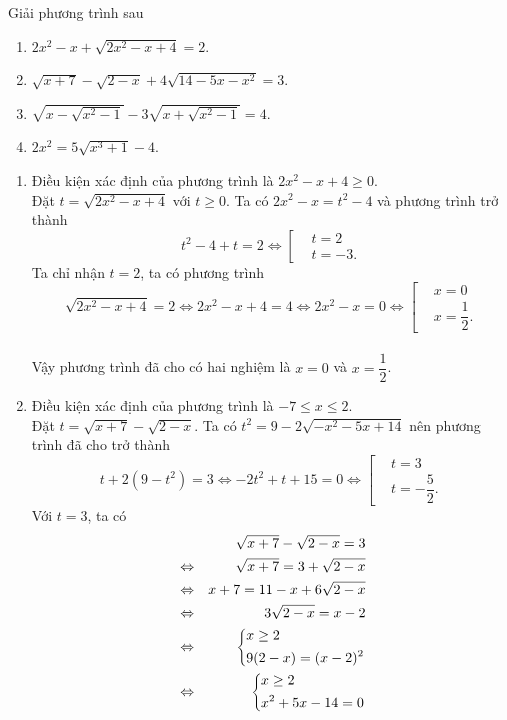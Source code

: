 \begin{vd}
	Giải phương trình sau
	\begin{enumerate}
		\item $2x^2-x+\sqrt{2x^2-x+4}=2$.
		\item $\sqrt{x+7}-\sqrt{2-x}+4\sqrt{14-5x-x^2}=3$.
		\item $\sqrt{x-\sqrt{x^2-1}}-3\sqrt{x+\sqrt{x^2-1}}=4$.
		\item $2x^2=5\sqrt{x^3+1}-4$.
	\end{enumerate}
	\loigiai
	{
		\begin{enumerate}
			\item Điều kiện xác định của phương trình là $2x^2-x+4 \geq 0$.\\
			Đặt $t=\sqrt{2x^2-x+4}$ với $t\geq 0$. Ta có $2x^2-x=t^2-4$ và phương trình trở thành
			$$t^2-4+t=2 \Leftrightarrow \left[\begin{aligned}&t=2 \\&t=-3.\end{aligned}\right.$$
			Ta chỉ nhận $t=2$, ta có phương trình 
			$$\sqrt{2x^2-x+4}=2 \Leftrightarrow 2x^2-x+4=4 \Leftrightarrow 2x^2-x=0 \Leftrightarrow \left[\begin{aligned}&x=0 \\&x=\dfrac{1}{2}.\end{aligned}\right.$$\\
			Vậy phương trình đã cho có hai nghiệm là $x=0$ và $x=\dfrac{1}{2}$.
			\item Điều kiện xác định của phương trình là $-7\leq x\leq 2$.\\
			Đặt $t=\sqrt{x+7}-\sqrt{2-x}$. Ta có $t^2=9-2\sqrt{-x^2-5x+14}$ nên phương trình đã cho trở thành
			$$t+2(9-t^2)=3 \Leftrightarrow -2t^2+t+15=0 \Leftrightarrow \left[\begin{aligned}&t=3 \\&t=-\dfrac{5}{2}.\end{aligned}\right.$$
			Với $t=3$, ta có
			\allowdisplaybreaks
			\begin{eqnarray*}
				&& \sqrt{x+7}-\sqrt{2-x}=3\\
				&\Leftrightarrow &\sqrt{x+7}=3+\sqrt{2-x} \\
				&\Leftrightarrow & x+7=11-x+6\sqrt{2-x}\\
				&\Leftrightarrow & 3\sqrt{2-x}=x-2\\
				&\Leftrightarrow & \heva{&x \geq 2 \\&9(2-x)=(x-2)^2}\\
				&\Leftrightarrow & \heva{&x \geq 2 \\& x^2 +5x-14 =0}\\

\end{eqnarray*}
\end{enumerate}}
\end{vd}
